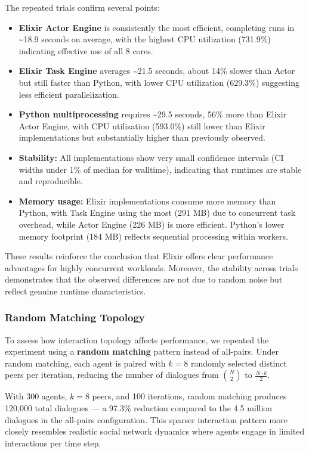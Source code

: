 \documentclass[
]{ceurart}
\begin{document}
The repeated trials confirm several points:
\begin{itemize}
	\item \textbf{Elixir Actor Engine} is consistently the most efficient, completing runs in \textasciitilde{}18.9 seconds on average, with the highest CPU utilization (731.9\%) indicating effective use of all 8 cores.
	\item \textbf{Elixir Task Engine} averages \textasciitilde{}21.5 seconds, about 14\% slower than Actor but still faster than Python, with lower CPU utilization (629.3\%) suggesting less efficient parallelization.
	\item \textbf{Python multiprocessing} requires \textasciitilde{}29.5 seconds, 56\% more than Elixir Actor Engine, with CPU utilization (593.0\%) still lower than Elixir implementations but substantially higher than previously observed.
	\item \textbf{Stability:} All implementations show very small confidence intervals (CI widths under 1\% of median for walltime), indicating that runtimes are stable and reproducible.
	\item \textbf{Memory usage:} Elixir implementations consume more memory than Python, with Task Engine using the most (291 MB) due to concurrent task overhead, while Actor Engine (226 MB) is more efficient. Python's lower memory footprint (184 MB) reflects sequential processing within workers.
\end{itemize}These results reinforce the conclusion that Elixir offers clear performance advantages for highly concurrent workloads. Moreover, the stability across trials demonstrates that the observed differences are not due to random noise but reflect genuine runtime characteristics.


\subsubsection{Random Matching Topology}
To assess how interaction topology affects performance, we repeated the experiment using a \textbf{random matching} pattern instead of all-pairs. Under random matching, each agent is paired with $k=8$ randomly selected distinct peers per iteration, reducing the number of dialogues from $\binom{N}{2}$ to $\frac{N \cdot k}{2}$.

With 300 agents, $k=8$ peers, and 100 iterations, random matching produces 120,000 total dialogues --- a 97.3\% reduction compared to the 4.5 million dialogues in the all-pairs configuration. This sparser interaction pattern more closely resembles realistic social network dynamics where agents engage in limited interactions per time step.
\end{document}
